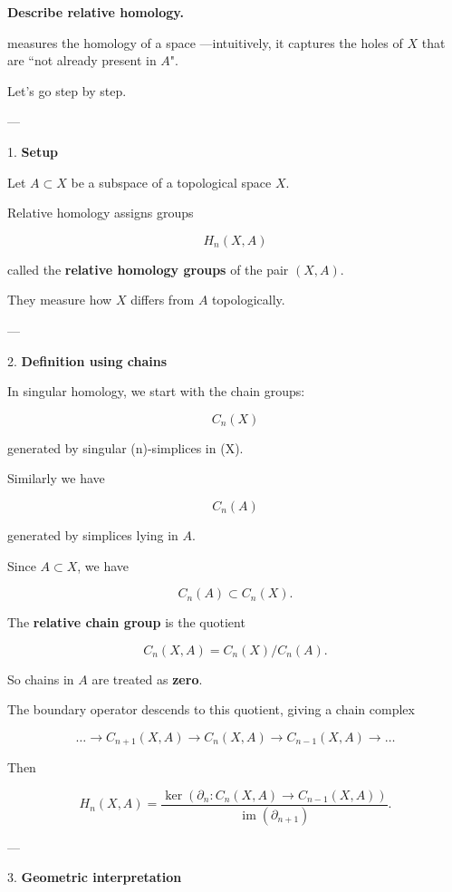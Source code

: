\documentclass[12pt,a4paper]{report}
\begin{document}
\begin{description}
\newpage
\item \textbf{Describe relative homology.}

 measures the homology of a space —intuitively, it captures the holes of $X$ that are ``not already present in $A$".

Let’s go step by step.

---

\begin{description}

\item 1. \textbf{Setup}

Let $A \subset X$ be a subspace of a topological space $X$.

Relative homology assigns groups

$$ H_n(X,A) $$

called the \textbf{relative homology groups} of the pair $(X,A)$.

They measure how $X$ differs from $A$ topologically.

---

\item 2. \textbf{Definition using chains}

In singular homology, we start with the chain groups:

$$ C_n(X) $$

generated by singular (n)-simplices in (X).

Similarly we have

$$ C_n(A) $$

generated by simplices lying in $A$.

Since $A \subset X$, we have

$$ C_n(A) \subset C_n(X).  $$

The \textbf{relative chain group} is the quotient

$$ C_n(X,A) = C_n(X) / C_n(A).  $$

So chains in $A$ are treated as \textbf{zero}.

The boundary operator descends to this quotient, giving a chain complex

$$ \dots \to C_{n+1}(X,A) \to C_n(X,A) \to C_{n-1}(X,A) \to \dots $$

Then

$$ H_n(X,A) = \frac{\ker(\partial_n : C_n(X,A)\to C_{n-1}(X,A))} {\operatorname{im}(\partial_{n+1})}.  $$

---

\item 3. \textbf{Geometric interpretation}


\end{description}
\end{description}
\end{document}
